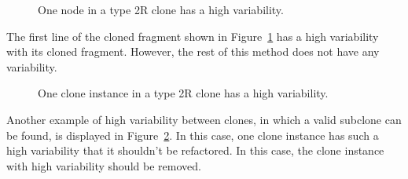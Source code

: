 \begin{figure}[H]
\begin{parcolumns}{2}
\end{parcolumns}
\caption{One node in a type 2R clone has a high variability.}
\label{fig:2rvariabilityhigh1}
\end{figure}

The first line of the cloned fragment shown in Figure~\ref{fig:2rvariabilityhigh1} has a high variability with its cloned fragment. However, the rest of this method does not have any variability. %

\begin{figure}[H]
\begin{parcolumns}{3}
\end{parcolumns}
\caption{One clone instance in a type 2R clone has a high variability.}
\label{fig:2rvariabilityhigh2}
\end{figure}

Another example of high variability between clones, in which a valid subclone can be found, is displayed in Figure~\ref{fig:2rvariabilityhigh2}. In this case, one clone instance has such a high variability that it shouldn't be refactored. In this case, the clone instance with high variability should be removed.

